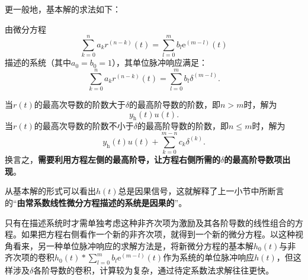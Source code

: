 更一般地，基本解的求法如下：
\begin{theorem}
    由微分方程
    \begin{equation}
        \sum_{k=0}^{n}a_{k} r^{(n-k)}(t)=\sum_{l=0}^{m}b_{l} \mathrm{e}^{(m-l)}(t)
    \end{equation}
    描述的系统（其中$a_0=b_0=1$），其单位脉冲响应满足：
    \begin{equation}
        \sum_{k=0}^{n}a_{k} r^{(n-k)}(t)=\sum_{l=0}^{m}b_{l} \delta^{(m-l)}.
    \end{equation}
\end{theorem}
当$r(t)$的最高次导数的阶数大于$\delta$的最高阶导数的阶数，即$n>m$时，解为
\begin{equation}
    y_{\text{h}}(t)u(t).
\end{equation}
当$r(t)$的最高次导数的阶数不小于$\delta$的最高阶导数的阶数，即$n\leq m$时，解为
\begin{equation}
    y_{\text{h}}(t)u(t)+\sum_{k=0}^{m-n}c_k \delta^{(k)}.
\end{equation}
换言之，\textbf{需要利用方程左侧的最高阶导，让方程右侧所需的$\delta$的最高阶导数项出现}。

从基本解的形式可以看出$h(t)$总是因果信号，这就解释了上一小节中所断言的“\textbf{由常系数线性微分方程描述的系统是因果的}”。

只有在描述系统时才需单独考虑这种非齐次项为激励及其各阶导数的线性组合的方程。如果把方程右侧看作一个新的非齐次项，就得到一个新的微分方程。以这种视角看来，另一种单位脉冲响应的求解方法是，将新微分方程的基本解$h_0(t)$与非齐次项的卷积$h_0(t)*\sum_{l=0}^{m}b_l \mathrm{e}^{(m-l)}(t)$作为系统的单位脉冲响应$h(t)$，但这样涉及$\delta$各阶导数的卷积，计算较为复杂，通过待定系数法求解往往更快。

